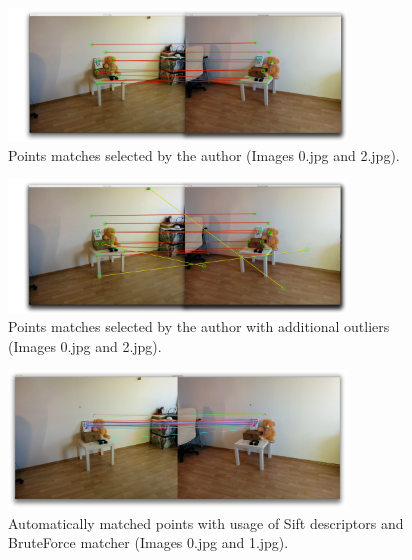 \begin{figure}[h!]
    \centering
    \includegraphics[width=0.8\textwidth]{02_matching}
    \caption{Points matches selected by the author (Images 0.jpg and 2.jpg).}
    \label{fig:02_matching}
\end{figure}
\begin{figure}[h!]
    \centering
    \includegraphics[width=0.8\textwidth]{02_matching_outliers}
    \caption{Points matches selected by the author with additional outliers (Images 0.jpg and 2.jpg).}
    \label{fig:02_matching_outliers}
\end{figure}

\begin{figure}[h!]
    \centering
    \includegraphics[width=0.8\textwidth]{f_02_auto_sift}
    \caption{Automatically matched points with usage of Sift descriptors and BruteForce matcher (Images 0.jpg and 1.jpg).}
    \label{fig:f_02_auto_sift}
\end{figure}

